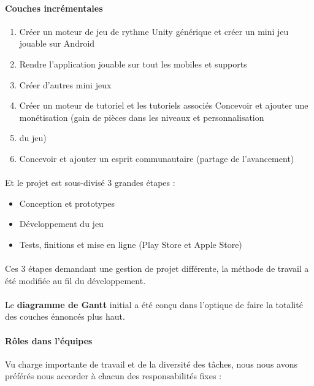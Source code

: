 \paragraph{Couches incrémentales}
\begin{enumerate}
\item Créer un moteur de jeu de rythme Unity générique et créer un mini jeu jouable sur Android
\item Rendre l’application jouable sur tout les mobiles et supports
\item Créer d’autres mini jeux
\item Créer un moteur de tutoriel et les tutoriels associés
Concevoir et ajouter une monétisation (gain de pièces dans les niveaux et personnalisation \item du jeu)
\item Concevoir et ajouter un esprit communautaire (partage de l’avancement)
\end{enumerate}

\paragraph{}
Et le projet est sous-divisé 3 grandes étapes :
\begin{itemize}
\item Conception et prototypes
\item Développement du jeu
\item Tests, finitions et mise en ligne (Play Store et Apple Store)
\end{itemize}

\paragraph{}
Ces 3 étapes demandant une gestion de projet différente, la méthode de travail a été modifiée au fil du développement.

\paragraph{}
Le \textbf{diagramme de Gantt} initial a été conçu dans l’optique de faire la totalité des couches énnoncés plus haut.

\paragraph{Rôles dans l’équipes}
Vu charge importante de travail et de la diversité des tâches, nous nous avons préférés nous accorder à chacun des responsabilités fixes :

